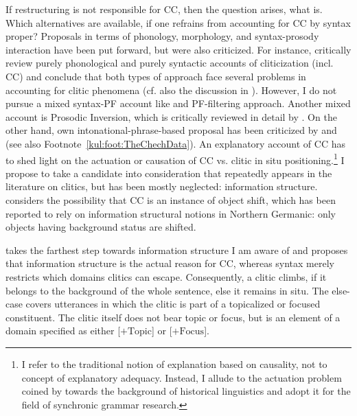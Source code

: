 \documentclass[output=paper,colorlinks,citecolor=brown]{langscibook}
\begin{document}
If restructuring is not responsible for CC, then the question arises, what is. Which alternatives are available, if one refrains from accounting for CC by syntax proper? Proposals in terms of phonology, morphology, and syntax-prosody interaction have been put forward, but were also criticized. For instance, \citet[287--291, 293--305]{FranksKing2000} critically review purely phonological and purely syntactic accounts of cliticization (incl. CC) and conclude that both types of approach face several problems in accounting for clitic phenomena (cf. also the discussion in \citealt[36--80]{Bošković2001}). However, I do not pursue a mixed syntax-PF account like  and  PF-filtering approach. Another mixed account is  Prosodic Inversion, which is critically reviewed in detail by \citet[11--36]{Bošković2001}. On the other hand,  own intonational-phrase-based proposal has been criticized by \citet[150--151]{Lenertova2004} and \citet[passim]{Golden2008} (see also Footnote~\ref{kul:foot:TheChechData}). An explanatory account of CC has to shed light on the actuation or causation of CC vs. clitic in situ positioning.\footnote{{I refer to the traditional notion of explanation based on causality, not to  concept of explanatory adequacy. Instead, I allude to the actuation problem coined by \citet{WeinreichHerzog1968} towards the background of historical linguistics and adopt it for the field of synchronic grammar research.}} I propose to take a candidate into consideration that repeatedly appears in the literature on clitics, but has been mostly neglected: information structure. \citet[206]{Stjepanovic2004} considers the possibility that CC is an instance of object shift, which has been reported to rely on information structural notions in Northern Germanic: only objects having background status are shifted.

\citet[82--83]{Junghanns2002a} takes the farthest step towards information structure I am aware of and proposes that information structure is the actual reason for CC, whereas syntax merely restricts which domains clitics can escape. Consequently, a clitic climbs, if it belongs to the background of the whole sentence, else it remains in situ. The else-case covers utterances in which the clitic is part of a topicalized or focused constituent. The clitic itself does not bear topic or focus, but is an element of a domain specified as either [$+\text{Topic}$] or [$+\text{Focus}$].
\end{document}
